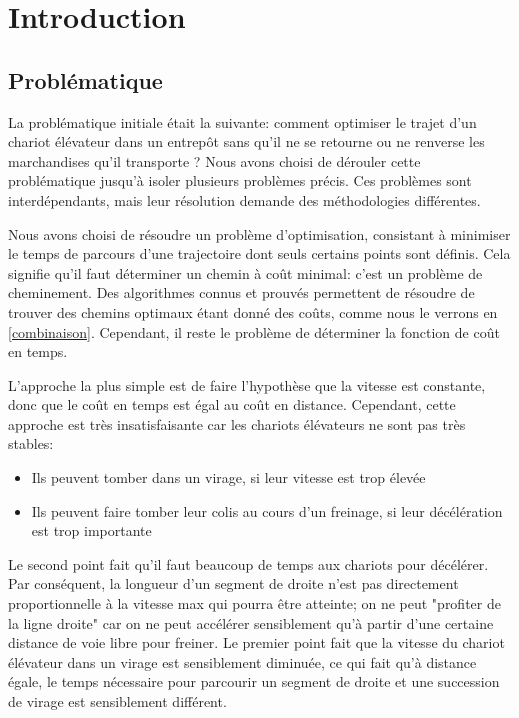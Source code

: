 \section*{Introduction}

\subsection{Problématique}
La problématique initiale était la suivante: comment optimiser le trajet d’un chariot élévateur dans un entrepôt sans qu’il ne se retourne ou ne renverse les marchandises qu’il transporte ? Nous avons choisi de dérouler cette problématique jusqu'à isoler plusieurs problèmes précis. Ces problèmes sont interdépendants, mais leur résolution demande des méthodologies différentes.

Nous avons choisi de résoudre un problème d'optimisation, consistant à minimiser le temps de parcours d'une trajectoire dont seuls certains points sont définis. Cela signifie qu'il faut déterminer un chemin à coût minimal: c'est un problème de cheminement. Des algorithmes connus et prouvés permettent de résoudre de trouver des chemins optimaux étant donné des coûts, comme nous le verrons en \ref{combinaison}. Cependant, il reste le problème de déterminer la fonction de coût en temps.

L'approche la plus simple est de faire l'hypothèse que la vitesse est constante, donc que le coût en temps est égal au coût en distance. Cependant, cette approche est très insatisfaisante car les chariots élévateurs ne sont pas très stables:
\begin{itemize}
	\item Ils peuvent tomber dans un virage, si leur vitesse est trop élevée
	\item Ils peuvent faire tomber leur colis au cours d'un freinage, si leur décélération est trop importante
\end{itemize}
Le second point fait qu'il faut beaucoup de temps aux chariots pour décélérer. Par conséquent, la longueur d'un segment de droite n'est pas directement proportionnelle à la vitesse max qui pourra être atteinte; on ne peut "profiter de la ligne droite" car on ne peut accélérer sensiblement qu'à partir d'une certaine distance de voie libre pour freiner.
Le premier point fait que la vitesse du chariot élévateur dans un virage est sensiblement diminuée, ce qui fait qu'à distance égale, le temps nécessaire pour parcourir un segment de droite et une succession de virage est sensiblement différent.

